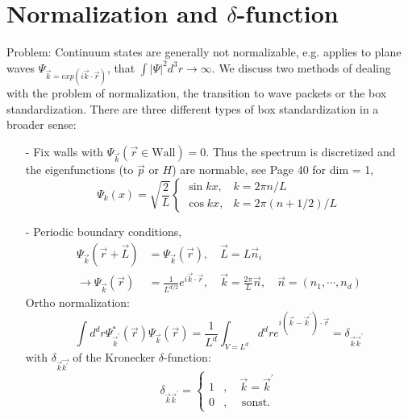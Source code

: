 \section{Normalization and $\delta$-function}
Problem: Continuum states are generally not normalizable, e.g. applies to plane waves $\Psi_{\vec{k}=exp(i\vec{k}\cdot\vec{r})}$, that $\int|\Psi|^2d^3r\to\infty$. We discuss two methods of dealing with the problem of normalization, the transition to wave packets or the box standardization. There are three different types of box standardization in a broader sense:
\begin{enumerate}
    \item[-] Fix walls with $\Psi_{\vec{k}}(\vec{r}\in\text{Wall})=0$. Thus the spectrum is discretized and the eigenfunctions (to $\vec{p}$ or $H$) are normable, see Page 40 for dim = 1,
    \begin{equation}
    \Psi_{k}(x)=\sqrt{\frac{2}{L}}\left\{\begin{array}{ll}{\sin k x,} & {k=2 \pi n / L} \\ {\cos k x,} & {k=2 \pi(n+1 / 2) / L}\end{array}\right.
    \end{equation}
    \item[-] Periodic boundary conditions,
    \begin{equation}
    \begin{aligned} \Psi_{\vec{k}}(\vec{r}+\vec{L}) &=\Psi_{\vec{k}}(\vec{r}), \quad \vec{L}=L \vec{n}_{i} \\ \rightarrow \Psi_{\vec{k}}(\vec{r}) &=\frac{1}{L^{d / 2}} e^{i \vec{k} \cdot \vec{r}}, \quad \vec{k}=\frac{2 \pi}{L} \vec{n}, \quad \vec{n}=\left(n_{1}, \cdots, n_{d}\right) \end{aligned}
    \end{equation}
    Ortho normalization:
    \begin{equation}
        \int d^{d} r \Psi_{\vec{k}^{\prime}}^{*}(\vec{r}) \Psi_{\vec{k}}(\vec{r})=\frac{1}{L^{d}} \int_{V=L^{d}} d^{d} r e^{i\left(\vec{k}-\vec{k}^{\prime}\right) \cdot \vec{r}}=\delta_{\vec{k} \vec{k}^{\prime}}
        \end{equation}
        with $\delta_{\vec{k}\vec{k^{\prime}}}$ of the Kronecker $\delta$-function:
        \begin{equation}
        \delta_{\vec{k} \vec{k}^{\prime}}=\left\{\begin{array}{ll}{1} & {, \quad \vec{k}=\vec{k}^{\prime}} \\ {0} & {, \quad \text { sonst. }}\end{array}\right.

\end{equation}
\end{enumerate}
